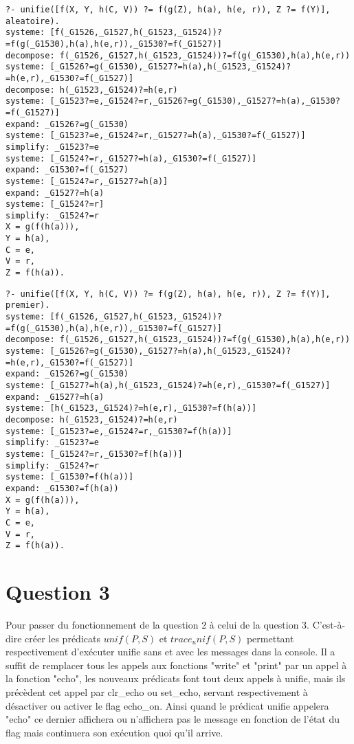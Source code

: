 \documentclass[10pt,a4paper]{report}
\begin{document}
\begin{lstlisting}[caption ={Exemple d'execution avec choix aléatoire}]
?- unifie([f(X, Y, h(C, V)) ?= f(g(Z), h(a), h(e, r)), Z ?= f(Y)], aleatoire).
systeme: [f(_G1526,_G1527,h(_G1523,_G1524))?=f(g(_G1530),h(a),h(e,r)),_G1530?=f(_G1527)]
decompose: f(_G1526,_G1527,h(_G1523,_G1524))?=f(g(_G1530),h(a),h(e,r))
systeme: [_G1526?=g(_G1530),_G1527?=h(a),h(_G1523,_G1524)?=h(e,r),_G1530?=f(_G1527)]
decompose: h(_G1523,_G1524)?=h(e,r)
systeme: [_G1523?=e,_G1524?=r,_G1526?=g(_G1530),_G1527?=h(a),_G1530?=f(_G1527)]
expand: _G1526?=g(_G1530)
systeme: [_G1523?=e,_G1524?=r,_G1527?=h(a),_G1530?=f(_G1527)]
simplify: _G1523?=e
systeme: [_G1524?=r,_G1527?=h(a),_G1530?=f(_G1527)]
expand: _G1530?=f(_G1527)
systeme: [_G1524?=r,_G1527?=h(a)]
expand: _G1527?=h(a)
systeme: [_G1524?=r]
simplify: _G1524?=r
X = g(f(h(a))),
Y = h(a),
C = e,
V = r,
Z = f(h(a)).
\end{lstlisting}

\begin{lstlisting}[caption ={Exemple d'execution avec comme choix le premier}]
?- unifie([f(X, Y, h(C, V)) ?= f(g(Z), h(a), h(e, r)), Z ?= f(Y)], premier).
systeme: [f(_G1526,_G1527,h(_G1523,_G1524))?=f(g(_G1530),h(a),h(e,r)),_G1530?=f(_G1527)]
decompose: f(_G1526,_G1527,h(_G1523,_G1524))?=f(g(_G1530),h(a),h(e,r))
systeme: [_G1526?=g(_G1530),_G1527?=h(a),h(_G1523,_G1524)?=h(e,r),_G1530?=f(_G1527)]
expand: _G1526?=g(_G1530)
systeme: [_G1527?=h(a),h(_G1523,_G1524)?=h(e,r),_G1530?=f(_G1527)]
expand: _G1527?=h(a)
systeme: [h(_G1523,_G1524)?=h(e,r),_G1530?=f(h(a))]
decompose: h(_G1523,_G1524)?=h(e,r)
systeme: [_G1523?=e,_G1524?=r,_G1530?=f(h(a))]
simplify: _G1523?=e
systeme: [_G1524?=r,_G1530?=f(h(a))]
simplify: _G1524?=r
systeme: [_G1530?=f(h(a))]
expand: _G1530?=f(h(a))
X = g(f(h(a))),
Y = h(a),
C = e,
V = r,
Z = f(h(a)).
\end{lstlisting}

\chapter*{Question 3}

Pour passer du fonctionnement de la question 2 à celui de la question 3. C'est-à-dire créer les prédicats $unif(P,S)$ et $trace_unif(P,S)$ permettant respectivement d'exécuter unifie sans et avec les messages dans la console. Il a suffit de remplacer tous les appels aux fonctions "write" et "print" par un appel à la fonction "echo", les nouveaux prédicats font tout deux appels à unifie, mais ils précèdent cet appel par clr\_echo ou set\_echo, servant respectivement à désactiver ou activer le flag echo\_on. Ainsi quand le prédicat unifie appelera "echo" ce dernier affichera ou n'affichera pas le message en fonction de l'état du flag mais continuera son exécution quoi qu'il arrive.
\end{document}
